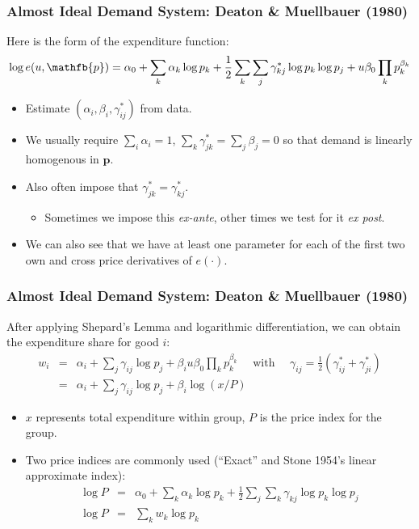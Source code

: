 \documentclass[xcolor=pdftex,dvipsnames,table,mathserif,aspectratio=169]{beamer}
\begin{document}
\begin{frame}
\frametitle{Almost Ideal Demand System: Deaton \& Muellbauer (1980)}
\small
Here is the form of the expenditure function:
\begin{eqnarray*}
\log e(u,\mathfb{p}) =  \alpha_0 + \sum_k \alpha_k \log p_k + \frac{1}{2} \sum_k \sum_j \gamma_{kj}^{*} \log p_k \log p_j + u \beta_0 \prod_k p_k^{\beta_k}
\end{eqnarray*}
\begin{itemize}
\item Estimate $(\alpha_i, \beta_i, \gamma_{ij}^*)$ from data.
\item We usually require $\sum_i \alpha_i =1$, $\sum_k \gamma_{jk}^* = \sum_j  \beta_j = 0$ so that demand is linearly homogenous in $\mathbf{p}$. 
\item Also often impose that $\gamma_{jk}^* = \gamma_{kj}^*$.
\begin{itemize}
\item Sometimes we impose this \textit{ex-ante}, other times we test for it \textit{ex post}.
\end{itemize}
\item We can also see that we have at least one parameter for each of the first two own and cross price derivatives of $e(\cdot)$.
\end{itemize}
\end{frame} 

\begin{frame}
\frametitle{Almost Ideal Demand System: Deaton \& Muellbauer (1980)}
\small
After applying Shepard's Lemma and logarithmic differentiation, we can obtain the expenditure share for good $i$:
\begin{eqnarray*}
w_i &=&\alpha_i + \sum_j \gamma_{ij} \log p_j + \beta_i u \beta_0 \prod_k p_k^{\beta_k} \quad \mbox{ with } \quad \gamma_{ij}= \frac{1}{2} (\gamma_{ij}^* + \gamma_{ji}^*) \\
      &=& \alpha_i + \sum_j \gamma_{ij} \log p_j + \beta_i \log (x / P)
\end{eqnarray*}
\vspace{-0.5cm}
\begin{itemize}
\item $x$ represents total expenditure within group, $P$ is the price index for the group.
\item Two price indices are commonly used (``Exact'' and Stone 1954's linear approximate index):
\begin{eqnarray*}
\log P &=&\alpha_0 + \sum_k \alpha_k \log p_k + \frac{1}{2} \sum_j \sum_k \gamma_{kj} \log p_k \log p_j\\
\log P &=& \sum_k w_k \log p_k
\end{eqnarray*}
\end{itemize}
\end{frame} 
\end{document}
